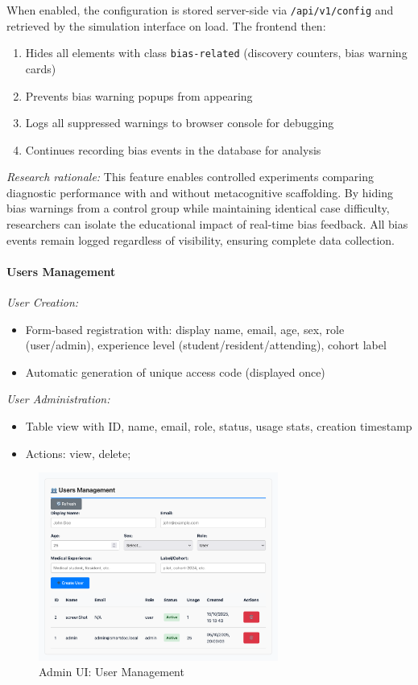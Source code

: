 When enabled, the configuration is stored server-side via \texttt{/api/v1/config} and retrieved by the simulation interface on load. The frontend then:
\begin{enumerate}
  \item Hides all elements with class \texttt{bias-related} (discovery counters, bias warning cards)
  \item Prevents bias warning popups from appearing
  \item Logs all suppressed warnings to browser console for debugging
  \item Continues recording bias events in the database for analysis
\end{enumerate}

\textit{Research rationale:} This feature enables controlled experiments comparing diagnostic performance with and without metacognitive scaffolding. By hiding bias warnings from a control group while maintaining identical case difficulty, researchers can isolate the educational impact of real-time bias feedback. All bias events remain logged regardless of visibility, ensuring complete data collection.

\paragraph{Users Management}
\textit{User Creation:}
\begin{itemize}
  \item Form-based registration with: display name, email, age, sex, role (user/admin), experience level (student/resident/attending), cohort label
  \item Automatic generation of unique access code (displayed once)
\end{itemize}


\textit{User Administration:}
\begin{itemize}
  \item Table view with ID, name, email, role, status, usage stats, creation timestamp
  \item Actions: view, delete;
\end{itemize}

\begin{figure}[h]
  \centering
  \includegraphics[width=0.7\textwidth]{figures/ui/ui_set2.png}
  \caption{Admin UI: User Management}
  \label{fig:ui-set2}
\end{figure}


